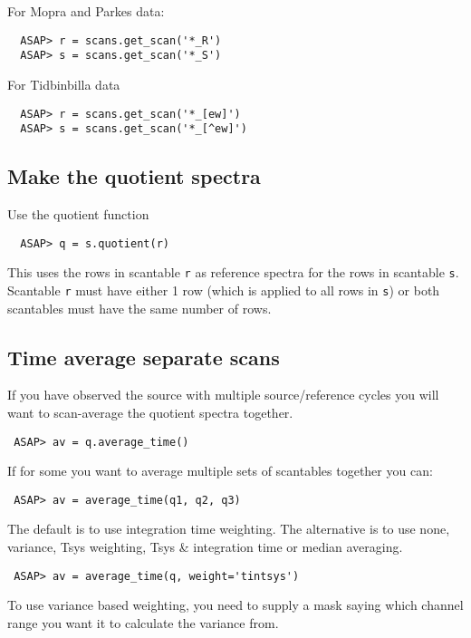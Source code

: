 \documentclass[11pt]{article}
\newcommand{\cmd}[1]{{\tt #1}}
\begin{document}
For Mopra and Parkes data:
\begin{verbatim}
  ASAP> r = scans.get_scan('*_R')
  ASAP> s = scans.get_scan('*_S')
\end{verbatim}

For Tidbinbilla data
\begin{verbatim}
  ASAP> r = scans.get_scan('*_[ew]')
  ASAP> s = scans.get_scan('*_[^ew]')
\end{verbatim}

\subsection{Make the quotient spectra}

Use the quotient function

\begin{verbatim}
  ASAP> q = s.quotient(r)
\end{verbatim}

This uses the rows in scantable \cmd{r} as reference spectra for the
rows in scantable \cmd{s}. Scantable \cmd{r} must have either 1 row
(which is applied to all rows in \cmd{s}) or both scantables must have
the same number of rows.

\subsection{Time average separate scans}

If you have observed the source with multiple
source/reference cycles you will want to scan-average the quotient
spectra together.

\begin{verbatim}
 ASAP> av = q.average_time()
\end{verbatim}

If for some you want to average multiple sets of scantables together
you can:

\begin{verbatim}
 ASAP> av = average_time(q1, q2, q3)
\end{verbatim}

The default is to use integration time weighting. The alternative is
to use none, variance, Tsys weighting, Tsys \& integration time or
median averaging.

\begin{verbatim}
 ASAP> av = average_time(q, weight='tintsys')
\end{verbatim}

To use variance based weighting, you need to supply a mask saying which
channel range you want it to calculate the variance from.
\end{document}
